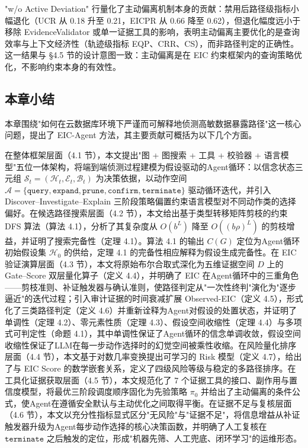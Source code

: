 \documentclass[a4paper,12pt]{ctexart}
\begin{document}
"w/o Active Deviation" 行量化了主动偏离机制本身的贡献：禁用后路径级指标小幅退化（UCR 从 0.18 升至 0.21，EICPR 从 0.66 降至 0.62），但退化幅度远小于移除 EvidenceValidator 或单一证据工具的影响，表明主动偏离主要优化的是查询效率与上下文经济性（轨迹级指标 EQP、CRR、CS），而非路径判定的正确性。这一结果与 §4.5 节的设计意图一致：主动偏离是在 EIC 约束框架内的查询策略优化，不影响约束本身的有效性。


\subsection{本章小结}

本章围绕"如何在云数据库环境下严谨而可解释地侦测高敏数据暴露路径"这一核心问题，提出了 EIC-Agent 方法，其主要贡献可概括为以下几个方面。

在整体框架层面（4.1 节），本文提出"图 + 图搜索 + 工具 + 校验器 + 语言模型"五位一体架构，将端到端侦测过程建模为假设驱动的Agent循环：以信念状态三元组 $\mathcal{S}_t = (\mathcal{H}_t, \mathcal{E}_t, \mathcal{B}_t)$ 为决策依据，以动作空间 $\mathcal{A} = \{\texttt{query}, \texttt{expand}, \texttt{prune}, \texttt{confirm}, \texttt{terminate}\}$ 驱动循环迭代，并引入 Discover–Investigate–Explain 三阶段策略偏置约束语言模型对不同动作类的选择偏好。在候选路径搜索层面（4.2 节），本文给出基于类型转移矩阵剪枝的约束 DFS 算法（算法 4.1），分析了其复杂度从 $O(b^L)$ 降至 $O((b\rho)^L)$ 的剪枝增益，并证明了搜索完备性（定理 4.1）。算法 4.1 的输出 $C(G)$ 定位为Agent循环初始假设集 $\mathcal{H}_0$ 的供给，定理 4.1 的完备性相应解释为假设生成完备性。在 EIC 验证演算层面（4.3 节），本文将原始布尔合取式深化为五维证据空间 $D$ 上的 Gate–Score 双层量化算子（定义 4.4），并明确了 EIC 在Agent循环中的三重角色——剪枝准则、补证触发器与确认准则，使路径判定从"一次性终判"演化为"逐步逼近"的迭代过程；引入审计证据的时间衰减扩展 Observed-EIC（定义 4.5），形式化了三类路径判定（定义 4.6）并重新诠释为Agent对假设的处置状态，并证明了单调性（定理 4.2）、零元素性质（定理 4.3）、假设空间收缩性（定理 4.4）与多项式可判定性（命题 4.1），其中单调性保证了Agent循环的信念单调收敛，假设空间收缩性保证了LLM在每一步动作选择时的幻觉空间被乘性收缩。在风险量化排序层面（4.4 节），本文基于对数几率变换提出可学习的 Risk 模型（定义 4.7），给出了与 EIC Score 的数学嵌套关系，定义了四级风险等级与稳定的多路径排序。在工具化证据获取层面（4.5 节），本文规范化了 7 个证据工具的接口、副作用与置信度模型，将最优三阶段调度顺序固化为先验策略 $\pi_0$ 并给出了主动偏离的条件公式，使Agent在遵循安全默认与主动优化之间取得平衡。在证据不足与复核层面（4.6 节），本文以充分性指标显式区分"无风险"与"证据不足"，将信息增益从补证触发器升级为Agent每步动作选择的核心决策函数，并明确了人工复核在 $\texttt{terminate}$ 之后触发的定位，形成"机器先筛、人工兜底、闭环学习"的运维形态。
\end{document}
